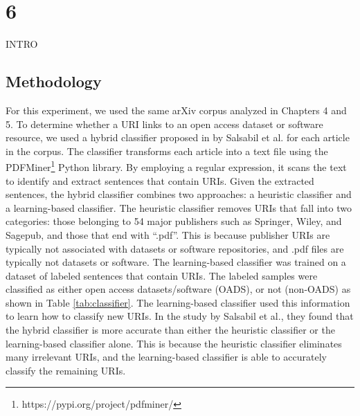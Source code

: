 \chapter{6}
\label{ch:6}


INTRO

\section{Methodology}

For this experiment, we used the same arXiv corpus analyzed in Chapters 4 and 5. To determine whether a URI links to an open access dataset or software resource, we used a hybrid classifier proposed in by Salsabil et al. \cite{salsabil2022study} for each article in the corpus. The classifier transforms each article into a text file using the PDFMiner\footnote{https://pypi.org/project/pdfminer/} Python library. By employing a regular expression, it scans the text to identify and extract sentences that contain URIs. Given the extracted sentences, the hybrid classifier combines two approaches: a heuristic classifier and a learning-based classifier. The heuristic classifier removes URIs that fall into two categories: those belonging to 54 major publishers such as Springer, Wiley, and Sagepub, and those that end with ``.pdf''. This is because publisher URIs are typically not associated with datasets or software repositories, and .pdf files are typically not datasets or software. The learning-based classifier was trained on a dataset of labeled sentences that contain URIs. The labeled samples were classified as either open access datasets/software (OADS), or not (non-OADS) as shown in Table \ref{tab:classifier}. The learning-based classifier used this information to learn how to classify new URIs. In the study by Salsabil et al., they found that the hybrid classifier is more accurate than either the heuristic classifier or the learning-based classifier alone. This is because the heuristic classifier eliminates many irrelevant URIs, and the learning-based classifier is able to accurately classify the remaining URIs.

